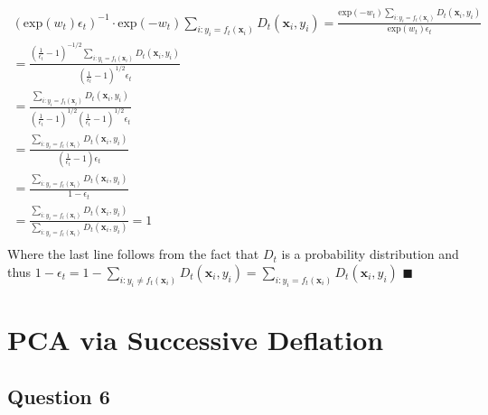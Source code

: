 \documentclass[11pt, oneside]{article}   	%
\begin{document}
\begin{gather*}
(\text{exp}(w_t) \epsilon_t)^{-1} \cdot \text{exp}(-w_t) \sum_{i : y_i = f_t(\boldsymbol{x}_i)}D_t(\boldsymbol{x}_i, y_i) = \frac{\text{exp}(-w_t) \sum_{i : y_i = f_t(\boldsymbol{x}_i)}D_t(\boldsymbol{x}_i, y_i)}{\text{exp}(w_t) \epsilon_t}\\
= \frac{(\frac{1}{\epsilon_t} - 1)^{-1/2}\sum_{i : y_i = f_t(\boldsymbol{x}_i)}D_t(\boldsymbol{x}_i, y_i)}{(\frac{1}{\epsilon_t} - 1)^{1/2}\epsilon_t}\\
= \frac{\sum_{i : y_i = f_t(\boldsymbol{x}_i)}D_t(\boldsymbol{x}_i, y_i)}{(\frac{1}{\epsilon_t} - 1)^{1/2}(\frac{1}{\epsilon_t} - 1)^{1/2}\epsilon_t}\\
= \frac{\sum_{i : y_i = f_t(\boldsymbol{x}_i)}D_t(\boldsymbol{x}_i, y_i)}{(\frac{1}{\epsilon_t} - 1)\epsilon_t}\\
= \frac{\sum_{i : y_i = f_t(\boldsymbol{x}_i)}D_t(\boldsymbol{x}_i, y_i)}{1 - \epsilon_t}\\
= \frac{\sum_{i : y_i = f_t(\boldsymbol{x}_i)}D_t(\boldsymbol{x}_i, y_i)}{\sum_{i : y_i = f_t(\boldsymbol{x}_i)}D_t(\boldsymbol{x}_i, y_i)} = 1\\
\end{gather*}
Where the last line follows from the fact that $D_t$ is a probability distribution and thus $1 - \epsilon_t = 1 - \sum_{i : y_i \neq f_t(\boldsymbol{x}_i)}D_t(\boldsymbol{x}_i, y_i) = \sum_{i : y_i = f_t(\boldsymbol{x}_i)}D_t(\boldsymbol{x}_i, y_i)$ $\blacksquare$
\newpage{}
\section{PCA via Successive Deflation}
\subsection{Question 6}
\end{document}
